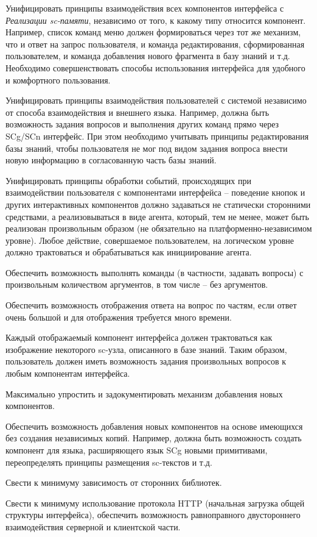 \begin{textitemize}
	\item Унифицировать принципы взаимодействия всех компонентов интерфейса с \textit{Реализации sc-памяти}, независимо от того, к какому типу относится компонент. Например, список команд меню должен формироваться через тот же механизм, что и ответ на запрос пользователя, и команда редактирования, сформированная пользователем, и команда добавления нового фрагмента в базу знаний и т.д. Необходимо совершенствовать способы использования интерфейса для удобного и комфортного пользования.
	\item Унифицировать принципы взаимодействия пользователей с системой независимо от способа взаимодействия и внешнего языка. Например, должна быть возможность задания вопросов и выполнения других команд прямо через SCg/SCn интерфейс. При этом необходимо учитывать принципы редактирования базы знаний, чтобы пользователя не мог под видом задания вопроса внести новую информацию в согласованную часть базы знаний.
	\item Унифицировать принципы обработки событий, происходящих при взаимодействии пользователя с компонентами интерфейса -- поведение кнопок и других интерактивных компонентов должно задаваться не статически сторонними средствами, а реализовываться в виде агента, который, тем не менее, может быть реализован произвольным образом (не обязательно на платформенно-независимом уровне). Любое действие, совершаемое пользователем, на логическом уровне должно трактоваться и обрабатываться как инициирование агента.
	\item Обеспечить возможность выполнять команды (в частности, задавать вопросы) с произвольным количеством аргументов, в том числе -- без аргументов.
	\item Обеспечить возможность отображения ответа на вопрос по частям, если ответ очень большой и для отображения требуется много времени.
	\item Каждый отображаемый компонент интерфейса должен трактоваться как изображение некоторого sc-узла, описанного в базе знаний. Таким образом, пользователь должен иметь возможность задания произвольных вопросов к любым компонентам интерфейса.
	\item Максимально упростить и задокументировать механизм добавления новых компонентов.
	\item Обеспечить возможность добавления новых компонентов на основе имеющихся без создания независимых копий. Например, должна быть возможность создать компонент для языка, расширяющего язык SCg новыми примитивами, переопределять принципы размещения sc-текстов и т.д.
	\item Свести к минимуму зависимость от сторонних библиотек.
	\item Свести к минимуму использование протокола HTTP (начальная загрузка общей структуры интерфейса), обеспечить возможность равноправного двустороннего взаимодействия серверной и клиентской части.
\end{textitemize}

